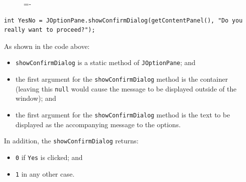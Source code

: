 \documentclass[a4paper]{systems-software}
\begin{document}
\begin{figure}[H]
	\lineskip=-\fboxrule
\end{figure}

\begin{lstlisting}[title={Creating a confirm dialog.}]
int YesNo = JOptionPane.showConfirmDialog(getContentPanel(), "Do you really want to proceed?");
\end{lstlisting}

As shown in the code above:
\begin{itemize}
	\item \texttt{showConfirmDialog} is a static method of \texttt{JOptionPane}; and
	\item the first argument for the \texttt{showConfirmDialog} method is the container (leaving this \texttt{null} would cause the message to be displayed outside of the window); and
	\item the first argument for the \texttt{showConfirmDialog} method is the text to be displayed as the accompanying message to the options.
\end{itemize}

In addition, the \texttt{showConfirmDialog} returns:
\begin{itemize}
	\item \texttt{0} if \texttt{Yes} is clicked; and
	\item \texttt{1} in any other case.
\end{itemize}
\end{document}
